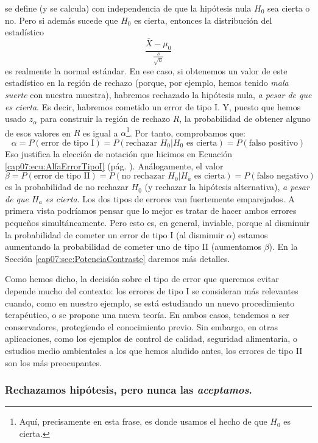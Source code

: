 se define (y se calcula) con independencia de que la hipótesis nula $H_0$ sea cierta o no. Pero si además sucede que $H_0$ es cierta, entonces la distribución del estadístico
     \[\dfrac{\bar X-\mu_0}{\frac{s}{\sqrt{n}}}\]
es realmente la normal estándar. En ese caso, si obtenemos un valor de este estadístico en la región de rechazo (porque, por ejemplo, hemos tenido {\em mala suerte} con nuestra muestra), habremos rechazado la hipótesis nula, {\em a pesar de que es cierta}. Es decir, habremos cometido un error de tipo I. Y, puesto que hemos usado $z_{\alpha}$ para construir la región de rechazo $R$,  la probabilidad de obtener alguno de esos valores en $R$ es igual a $\alpha$\footnote{Aquí, precisamente en esta frase, es donde usamos el hecho de que $H_0$ es cierta.}. Por tanto, comprobamos que:
    \[\alpha=P(\mbox{error de tipo I})=
    P(\mbox{rechazar }H_0 | H_0\mbox{ es cierta})=
    P(\mbox{falso positivo})\]
Eso justifica la elección de notación que hicimos en Ecuación \ref{cap07:ecu:AlfaErrorTipoI} (pág. \pageref{cap07:ecu:AlfaErrorTipoI}). Análogamente, el valor
    \[\beta=P(\mbox{error de tipo II})=
    P(\mbox{no rechazar }H_0 | H_a\mbox{ es cierta})=
    P(\mbox{falso negativo})\]
es la probabilidad
de no rechazar $H_0$ (y rechazar la hipótesis alternativa), {\em a pesar de que $H_a$ es cierta}. Los dos tipos de errores van fuertemente emparejados. A primera vista podríamos pensar que lo mejor es tratar de hacer ambos errores pequeños simultáneamente. Pero esto es, en general, inviable, porque al disminuir la probabilidad de cometer un error de tipo I (al disminuir $\alpha$) estamos aumentando la probabilidad de cometer uno de tipo II (aumentamos $\beta$). En la Sección \ref{cap07:sec:PotenciaContraste} daremos más detalles.

Como hemos dicho, la decisión sobre el tipo de error que queremos evitar depende mucho del contexto: los errores de tipo I se consideran más relevantes cuando, como en nuestro ejemplo, se está estudiando un nuevo procedimiento terapéutico, o se propone una nueva teoría. En ambos casos, tendemos a ser conservadores, protegiendo el conocimiento previo. Sin embargo, en otras aplicaciones, como los ejemplos de control de calidad, seguridad alimentaria, o estudios medio ambientales a los que hemos aludido antes, los errores de tipo II son los más preocupantes.

\subsubsection*{Rechazamos hipótesis, pero nunca las {\em aceptamos}.}

